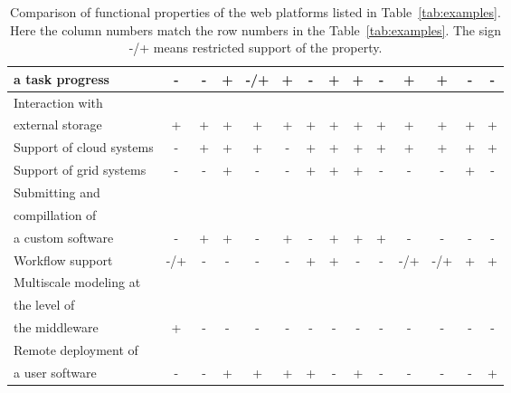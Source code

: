 \documentclass[procedia]{easychair}
\begin{document}
\begin{table}[htp]
\begin{centering}
\begin{tabular}{|l|c|c|c|c|c|c|c|c|c|c|c|c|c|}
   	 \small{a task progress}	                                      & - & - & + & -/+ & + & - & + & + & - & + & + & - & - \\
         	\hline
   	 \small{Interaction with}                                          &   &   &   &   &   &   &   &   &   &   &   &   &  \\
   	 \small{external storage}                                          & + & + & + & + & + & + & + & + & + & + & + & + & + \\
   	     	\hline
   	 \small{Support of cloud systems}                                  & - & + & + & + & - & + & + & + & + & + & + & + & + \\
        	 \hline
   	 \small{Support of grid systems}                                   & - & - & + & - & - & + & + & + & - & - & - & + & - \\    
   	    	 \hline
   	 \small{Submitting and}                                             &   &   &   &   &   &   &   &   &   &   &   &   &  \\
   	 \small{compillation of}                                            &   &   &   &   &   &   &   &   &   &   &   &   &  \\
   	 \small{a custom software}                                           & - & + & + & - & + & - & + & + & + & - & - & - & - \\    
    	 \hline
   	 \small{Workflow support}                                          & -/+ & - & - & - & - & + & + & - & - & -/+ & -/+ & + & + \\
	\hline
     \small{Multiscale modeling at}                                    &   &   &   &   &   &   &   &   &   &   &   &   &   \\         
     \small{the level of}                                            &   &   &   &   &   &   &   &   &   &   &   &   &   \\
      \small{the middleware}                               & + & - & - & - & - & - & - & - & - & - & - & - & - \\          
	      \hline
	 \small{Remote deployment of}                                      &   &   &   &   &   &   &   &   &   &   &   &  & \\
	 \small{a user software}                                           & - & - & + & + & + & + & - & + & - & - & - & - & + \\    
	      \hline	
		\end{tabular}
		\caption{Comparison of functional properties of the web platforms listed in Table~\ref{tab:examples}. Here the column numbers match the row numbers in the Table~\ref{tab:examples}. The sign -/+ means restricted support of the property.}
		\label{tab:comparison}
	\end{centering}
\end{table}
\end{document}
